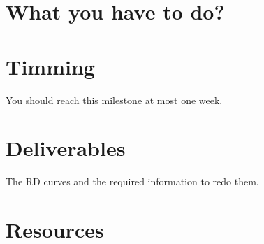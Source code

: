 \begin{comment}
Obviously, we can not use the previous algoritm for computing the RD
curves in a real-time application such as InterCom.\footnote{The
amount of computational resources would increase significatively.} We
need to make some assumptions in order to reduce the computational
cost of finding the RD curves. The first of our assumptions is that
between (temporally) adjacent chunks the RD curves are going to be
similar. Therefore, we can build the RD curve for the current chunk by
using the RD points generated\footnote{Each chunk is quantized and
compressed, so, we only need to compute the distortion to have the RD
point used for the chunk.} by the compression of previously processed
chunks. The second assumption is that we can estimate the average
slope of the complete RD curve by using only 2 RD points. Using this
information, we will try to use, for the current chunk, a pair of
$\Delta_i$ quantization steps that produce two RD curves (one curve
per subband) with the same average slope.
\end{comment}

\section{What you have to do?}


\begin{comment}
\begin{enumerate}
\item In a module named stereo\_coding.py, inherit the class
  Quantization and create a class named Stereo\_Coding.
\item Override the methods pack() and unpack(). In pack() perform the
  analysis transform previously described, and in unpack() the
  synthesis transform. These procedures should be applied to all the
  frames of a chunk using
  \href{https://www.oreilly.com/library/view/python-for-data/9781449323592/ch04.html}{vectorized
    operations}.
\item Has the
  \href{https://en.wikipedia.org/wiki/Data_compression_ratio}{compression
    ratio} been improved (on
  \href{https://en.wikipedia.org/wiki/Average}{average})? How much?
\end{enumerate}
\end{comment}

\section{Timming}

You should reach this milestone at most one week.

\section{Deliverables}

The RD curves and the required information to redo them.

\section{Resources}


